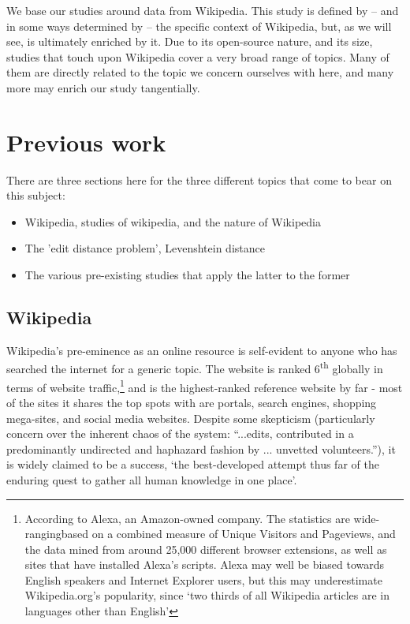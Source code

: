 \documentclass[a4paper,11pt,twoside,notitlepage]{article}
\newcommand{\super}[1]{\textsuperscript{#1}}
\begin{document}
        We base our studies around data from Wikipedia. This study is
        defined by -- and in some ways determined by -- the specific
        context of Wikipedia, but, as we will see, is ultimately
        enriched by it. Due to its open-source nature, and its size,
        studies that touch upon Wikipedia cover a very broad range of
        topics. Many of them are directly related to the topic we
        concern ourselves with here, and many more may enrich our
        study tangentially. 
 
        \section{Previous work}
        There are three sections here for the three different topics
        that come to bear on this subject:
        \begin{itemize}
          \item Wikipedia, studies of wikipedia, and the nature of
            Wikipedia
          \item The 'edit distance problem', Levenshtein distance
          \item The various pre-existing studies that apply the latter
            to the former
        \end{itemize}
        
        \subsection{Wikipedia}
        Wikipedia's pre-eminence as an online resource is self-evident
        to anyone who has searched the internet for a generic
        topic. The website is ranked 6\super{th} globally in terms of
        website traffic,\footnote{According to Alexa, an Amazon-owned
          company. The statistics are wide-rangingbased on a combined
          measure of Unique Visitors and Pageviews, and the data mined
          from around 25,000 different browser extensions, as well as
          sites that have installed Alexa's
          scripts.\cite{Alexa-about2014} Alexa may well be biased
          towards English speakers and Internet Explorer users, but
          this may underestimate Wikipedia.org's popularity, since
          `two thirds of all Wikipedia articles are in languages other
          than English'\cite{wikimedia-noteonalexa}} and is the
        highest-ranked reference website by far - most of the sites it
        shares the top spots with are portals, search engines,
        shopping mega-sites, and social media
        websites.\cite{Alexa-topsites2014} Despite some skepticism
        (particularly concern over the inherent chaos of the system:
        ``...edits, contributed in a predominantly undirected and
        haphazard fashion by ... unvetted
        volunteers.''\cite{Wilkinson2007}), it is widely
        claimed to be a success, `the best-developed attempt thus
        far of the enduring quest to gather all human knowledge in one
        place'\cite{Mesgari2014}.
\end{document}
